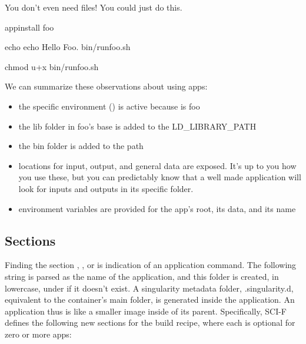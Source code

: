 \documentclass[letterpaper,10pt,english]{sphinxmanual}
\begin{document}
You don’t even need files! You could just do this.

%
\begin{sphinxVerbatim}[commandchars=\\\{\}]
\PYGZpc{}appinstall foo

    echo \PYGZsq{}echo \PYGZdq{}Hello Foo.\PYGZdq{}\PYGZsq{} \PYGZgt{}\PYGZgt{} bin/runfoo.sh

    chmod u+x bin/runfoo.sh
\end{sphinxVerbatim}

We can summarize these observations about using apps:
\begin{itemize}
\item {} 
the specific environment () is active because  is foo

\item {} 
the lib folder in foo’s base is added to the LD\_LIBRARY\_PATH

\item {} 
the bin folder is added to the path

\item {} 
locations for input, output, and general data are exposed. It’s up to
you how you use these, but you can predictably know that a well made
application will look for inputs and outputs in its specific folder.

\item {} 
environment variables are provided for the app’s root, its data, and
its name

\end{itemize}


\subsection{Sections}
\label{\detokenize{reproducible_scif_apps:sections}}
Finding the section  ,  , or  is indication of an application command.
The following string is parsed as the name of the application, and
this folder is created, in lowercase, under  if it doesn’t exist. A
singularity metadata folder, .singularity.d, equivalent to the
container’s main folder, is generated inside the application. An
application thus is like a smaller image inside of its parent.
Specifically, SCI-F defines the following new sections for the build
recipe, where each is optional for zero or more apps:
\end{document}
